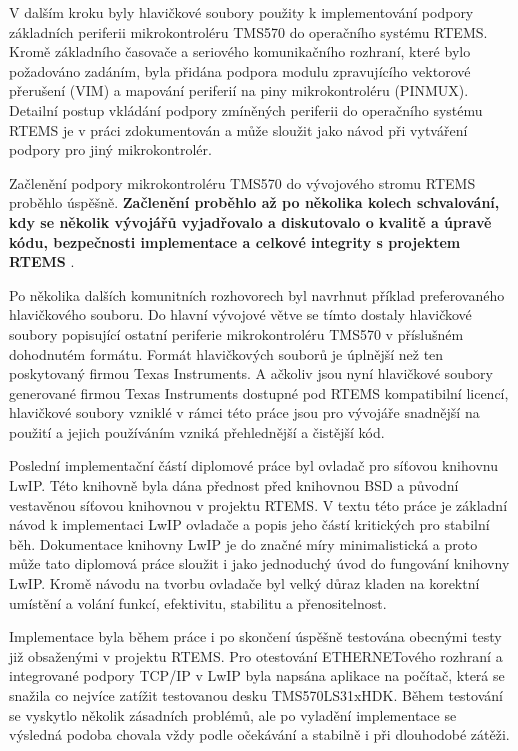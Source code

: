 V dalším kroku byly hlavičkové soubory použity k implementování podpory základních periferii mikrokontroléru TMS570 do operačního systému RTEMS.
Kromě základního časovače a seriového komunikačního rozhraní, které bylo požadováno zadáním, byla přidána podpora modulu zpravujícího vektorové přerušení (VIM) a mapování periferií na piny mikrokontroléru (PINMUX).
Detailní postup vkládání podpory zmíněných periferii do operačního systému RTEMS je v práci zdokumentován a může sloužit jako návod při vytváření podpory pro jiný mikrokontrolér.

Začlenění podpory mikrokontroléru TMS570 do vývojového stromu RTEMS proběhlo úspěšně.
{\bf Začlenění proběhlo až po několika kolech schvalování, kdy se několik vývojářů vyjadřovalo a diskutovalo o kvalitě a úpravě kódu, bezpečnosti implementace a celkové integrity s projektem RTEMS }.

Po několika dalších komunitních rozhovorech byl navrhnut příklad preferovaného hlavičkového souboru.
Do hlavní vývojové větve se tímto dostaly hlavičkové soubory popisující ostatní periferie mikrokontroléru TMS570 v příslušném dohodnutém formátu.
Formát hlavičkových souborů je úplnější než ten poskytovaný firmou Texas Instruments.
A ačkoliv jsou nyní hlavičkové soubory generované firmou Texas Instruments dostupné pod RTEMS kompatibilní licencí, hlavičkové soubory vzniklé v rámci této práce jsou pro vývojáře snadnější na použití a jejich používáním vzniká přehlednější a čistější kód. 

Poslední implementační částí diplomové práce byl ovladač pro síťovou knihovnu LwIP.
Této knihovně byla dána přednost před knihovnou BSD a původní vestavěnou síťovou knihovnou v projektu RTEMS.
V textu této práce je základní návod k implementaci LwIP ovladače a popis jeho částí kritických pro stabilní běh.
Dokumentace knihovny LwIP je do značné míry minimalistická a proto může tato diplomová práce sloužit i jako jednoduchý úvod do fungování knihovny LwIP.
Kromě návodu na tvorbu ovladače byl velký důraz kladen na korektní umístění a volání funkcí, efektivitu, stabilitu a přenositelnost.

Implementace byla během práce i po skončení úspěšně testována obecnými testy již obsaženými v projektu RTEMS.
Pro otestování ETHERNETového rozhraní a integrované podpory TCP/IP v LwIP byla napsána aplikace na počítač, která se snažila co nejvíce zatížit testovanou desku TMS570LS31xHDK.
Během testování se vyskytlo několik zásadních problémů, ale po vyladění implementace se výsledná podoba chovala vždy podle očekávání a stabilně i při dlouhodobé zátěži.




\bye
\grid
